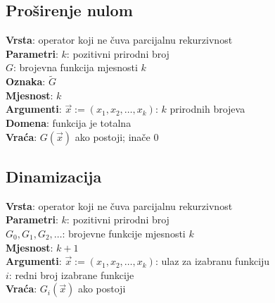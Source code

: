 \subsection{Proširenje nulom}
\textbf{Vrsta}: operator koji ne čuva parcijalnu rekurzivnost\\
\textbf{Parametri}: $k$: pozitivni prirodni broj\\
$G$: brojevna funkcija mjesnosti $k$\\
\textbf{Oznaka}: $\tilde G$\\
\textbf{Mjesnost}: $k$\\
\textbf{Argumenti}: $\vec x:=(x_1,x_2,\dots,x_k)$: $k$ prirodnih brojeva\\
\textbf{Domena}: funkcija je totalna\\
\textbf{Vraća}: $G(\vec x)$ ako postoji; inače $0$

\subsection{Dinamizacija}
\textbf{Vrsta}: operator koji ne čuva parcijalnu rekurzivnost\\
\textbf{Parametri}: $k$: pozitivni prirodni broj\\
$G_0,G_1,G_2,\dots$: brojevne funkcije mjesnosti $k$\\
\textbf{Mjesnost}: $k+1$\\
\textbf{Argumenti}: $\vec x:=(x_1,x_2,\dots,x_k)$: ulaz za izabranu funkciju\\
$i$: redni broj izabrane funkcije\\
\textbf{Vraća}: $G_i(\vec x)$ ako postoji
